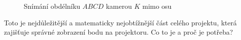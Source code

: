 \documentclass[twoside,12pt]{article}
\begin{document}
\begin{figure}[ht]
 \begin{center}
 \end{center}
 \caption{Snímání obdélníku $ABCD$ kamerou $K$ mimo osu}
\end{figure}
Toto je nejdůležitější a matematicky nejobtížnější část celého projektu, která zajišťuje správné zobrazení bodu na projektoru. Co to je a proč je potřeba?
\end{document}
